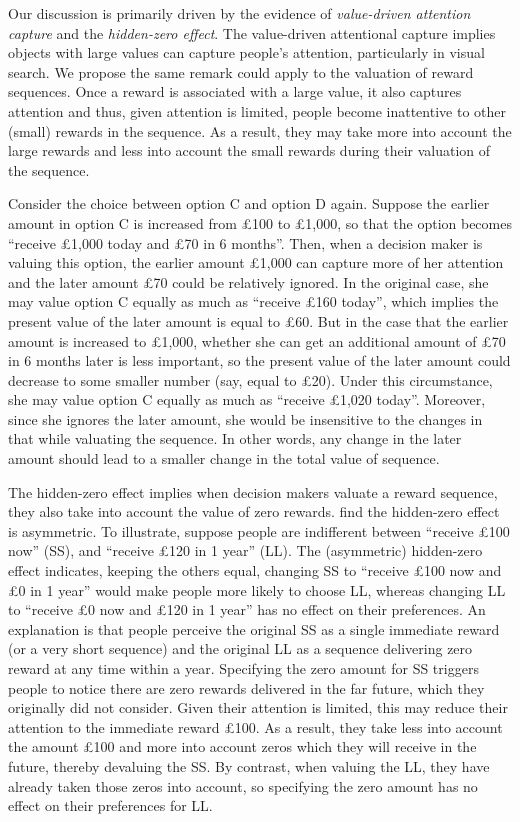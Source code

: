 \documentclass[
  12pt,
]{article}
\begin{document}
Our discussion is primarily driven by the evidence of \emph{value-driven
attention capture} and the \emph{hidden-zero effect}. The value-driven
attentional capture implies objects with large values can capture
people's attention, particularly in visual search. We propose the same
remark could apply to the valuation of reward sequences. Once a reward
is associated with a large value, it also captures attention and thus,
given attention is limited, people become inattentive to other (small)
rewards in the sequence. As a result, they may take more into account
the large rewards and less into account the small rewards during their
valuation of the sequence.

Consider the choice between option C and option D again. Suppose the
earlier amount in option C is increased from £100 to £1,000, so that the
option becomes ``receive £1,000 today and £70 in 6 months''. Then, when
a decision maker is valuing this option, the earlier amount £1,000 can
capture more of her attention and the later amount £70 could be
relatively ignored. In the original case, she may value option C equally
as much as ``receive £160 today'', which implies the present value of
the later amount is equal to £60. But in the case that the earlier
amount is increased to £1,000, whether she can get an additional amount
of £70 in 6 months later is less important, so the present value of the
later amount could decrease to some smaller number (say, equal to £20).
Under this circumstance, she may value option C equally as much as
``receive £1,020 today''. Moreover, since she ignores the later amount,
she would be insensitive to the changes in that while valuating the
sequence. In other words, any change in the later amount should lead to
a smaller change in the total value of sequence.

The hidden-zero effect \citep{magen2008hidden, radu2011mechanism}
implies when decision makers valuate a reward sequence, they also take
into account the value of zero rewards. \citet{read2017value} find the
hidden-zero effect is asymmetric. To illustrate, suppose people are
indifferent between ``receive £100 now'' (SS), and ``receive £120 in 1
year'' (LL). The (asymmetric) hidden-zero effect indicates, keeping the
others equal, changing SS to ``receive £100 now and £0 in 1 year'' would
make people more likely to choose LL, whereas changing LL to ``receive
£0 now and £120 in 1 year'' has no effect on their preferences. An
explanation is that people perceive the original SS as a single
immediate reward (or a very short sequence) and the original LL as a
sequence delivering zero reward at any time within a year. Specifying
the zero amount for SS triggers people to notice there are zero rewards
delivered in the far future, which they originally did not consider.
Given their attention is limited, this may reduce their attention to the
immediate reward £100. As a result, they take less into account the
amount £100 and more into account zeros which they will receive in the
future, thereby devaluing the SS. By contrast, when valuing the LL, they
have already taken those zeros into account, so specifying the zero
amount has no effect on their preferences for LL.
\end{document}
